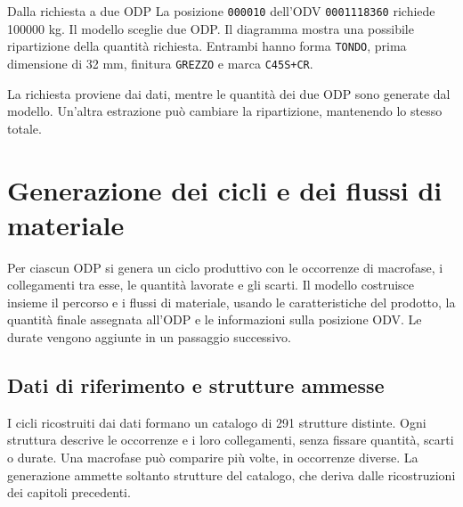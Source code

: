 \begingroup
{}
\begin{examplebox}{Dalla richiesta a due ODP}
La posizione \texttt{000010} dell'ODV \texttt{0001118360} richiede \num{100000} kg. Il modello sceglie due ODP. Il diagramma mostra una possibile ripartizione della quantità richiesta. Entrambi hanno forma \texttt{TONDO}, prima dimensione di 32 mm, finitura \texttt{GREZZO} e marca \texttt{C45S+CR}.

\begin{center}
\reportfigurecontent{}
\end{center}

La richiesta proviene dai dati, mentre le quantità dei due ODP sono generate dal modello. Un'altra estrazione può cambiare la ripartizione, mantenendo lo stesso totale.
\end{examplebox}
\endgroup

\section{Generazione dei cicli e dei flussi di materiale}
\label{sec:graph-and-material-generation}

Per ciascun ODP si genera un ciclo produttivo con le occorrenze di macrofase, i collegamenti tra esse, le quantità lavorate e gli scarti. Il modello costruisce insieme il percorso e i flussi di materiale, usando le caratteristiche del prodotto, la quantità finale assegnata all'ODP e le informazioni sulla posizione ODV. Le durate vengono aggiunte in un passaggio successivo.

\subsection{Dati di riferimento e strutture ammesse}
\label{sec:graph-generation-data}

I cicli ricostruiti dai dati formano un catalogo di 291 strutture distinte. Ogni struttura descrive le occorrenze e i loro collegamenti, senza fissare quantità, scarti o durate. Una macrofase può comparire più volte, in occorrenze diverse. La generazione ammette soltanto strutture del catalogo, che deriva dalle ricostruzioni dei capitoli precedenti.

